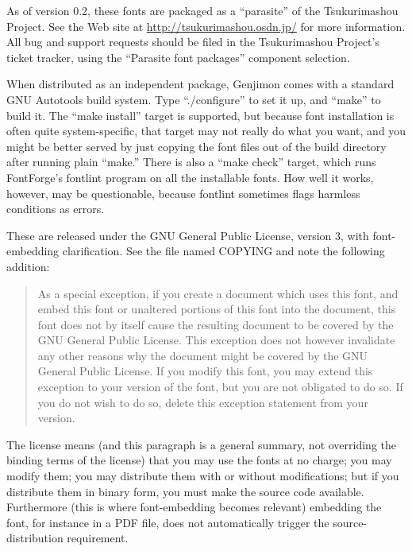 \documentclass{mitsuba}
\begin{document}
As of version 0.2, these fonts are packaged as a ``parasite'' of the
Tsukurimashou Project.  See the Web site at
\url{http://tsukurimashou.osdn.jp/} for more information.  All bug
and support requests should be filed in the Tsukurimashou Project's ticket
tracker, using the ``Parasite font packages'' component selection.

When distributed as an independent package, Genjimon comes with a standard
GNU Autotools build system.  Type ``./configure'' to set it up, and ``make''
to build it.  The ``make install'' target is supported, but because font
installation is often quite system-specific, that target may not really do
what you want, and you might be better served by just copying the font files
out of the build directory after running plain ``make.''  There is also a
``make check'' target, which runs FontForge's fontlint program on all the
installable fonts.  How well it works, however, may be questionable, because
fontlint sometimes flags harmless conditions as errors.

These are released under the GNU General Public License, version 3, with
font-embedding clarification.  See the file named COPYING and note the
following addition:

\begin{quotation}
As a special exception, if you create a document which uses this font, and
embed this font or unaltered portions of this font into the document, this
font does not by itself cause the resulting document to be covered by the
GNU General Public License. This exception does not however invalidate any
other reasons why the document might be covered by the GNU General Public
License. If you modify this font, you may extend this exception to your
version of the font, but you are not obligated to do so. If you do not wish
to do so, delete this exception statement from your version.
\end{quotation}

The license means (and this paragraph is a general summary, not overriding
the binding terms of the license) that you may use the fonts at no charge;
you may modify them; you may distribute them with or without modifications;
but if you distribute them in binary form, you must make the source code
available.  Furthermore (this is where font-embedding becomes relevant)
embedding the font, for instance in a PDF file, does not automatically
trigger the source-distribution requirement.
\end{document}
